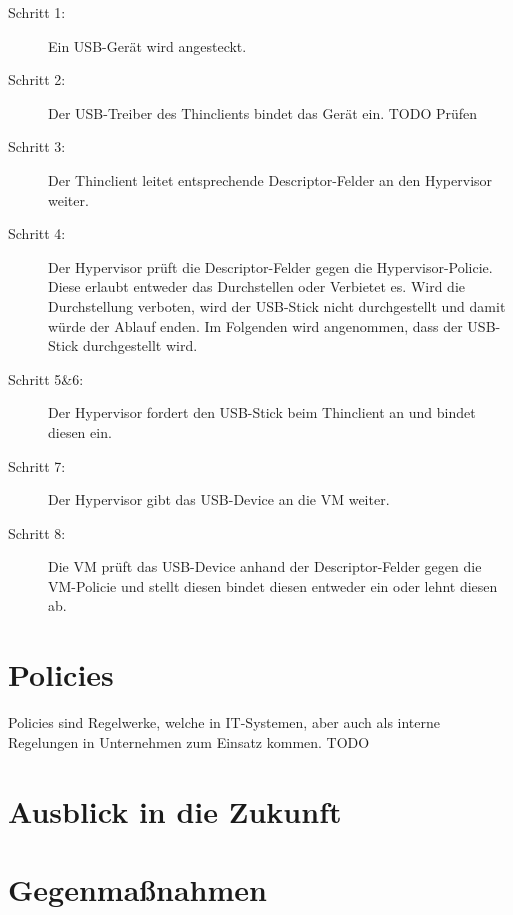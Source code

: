 \documentclass[a4paper,11pt,DIV=11,BROC=5mm,bigheadings,idxtotoc,cleardoubleempty,halfparskip,oneside,openright]{scrreprt} %
\begin{document}
\begin{description}
	\item[Schritt 1: ] Ein USB-Gerät wird angesteckt.
	\item[Schritt 2: ] Der USB-Treiber des Thinclients bindet das Gerät ein. TODO Prüfen
	\item[Schritt 3: ] Der Thinclient leitet entsprechende Descriptor-Felder an den Hypervisor weiter.
	\item[Schritt 4: ] Der Hypervisor prüft die Descriptor-Felder gegen die Hypervisor-Policie. Diese erlaubt entweder das Durchstellen oder Verbietet es. Wird die Durchstellung verboten, wird der USB-Stick nicht durchgestellt und damit würde der Ablauf enden. Im Folgenden wird angenommen, dass der USB-Stick durchgestellt wird.
	\item[Schritt 5\&6: ] Der Hypervisor fordert den USB-Stick beim Thinclient an und bindet diesen ein.
	\item[Schritt 7: ] Der Hypervisor gibt das USB-Device an die VM weiter.
	\item[Schritt 8: ] Die VM prüft das USB-Device anhand der Descriptor-Felder gegen die VM-Policie und stellt diesen bindet diesen entweder ein oder lehnt diesen ab.
\end{description}

			
			
			
			\chapter{Policies} \label{Policies}
Policies sind Regelwerke, welche in IT-Systemen, aber auch als interne Regelungen in Unternehmen zum Einsatz kommen. TODO


			

			\chapter{Ausblick in die Zukunft}			
			
			\chapter{Gegenmaßnahmen}
	
			
			
			
			
			\newpage
		
	
\end{document}
